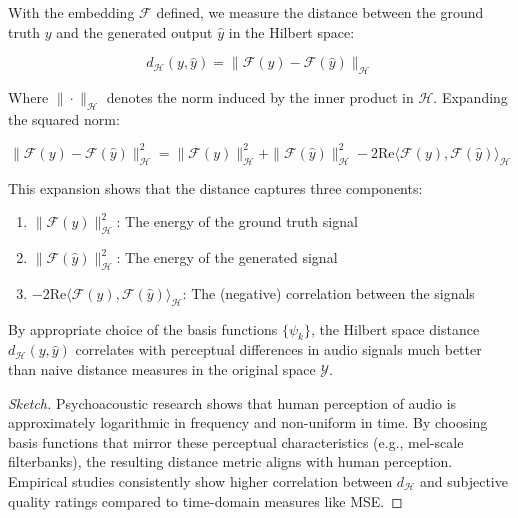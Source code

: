 With the embedding $\mathcal{F}$ defined, we measure the distance between the ground truth $y$ and the generated output $\hat{y}$ in the Hilbert space:

\begin{equation}
d_{\mathcal{H}}(y, \hat{y}) = \|\mathcal{F}(y) - \mathcal{F}(\hat{y})\|_{\mathcal{H}}
\end{equation}

Where $\|\cdot\|_{\mathcal{H}}$ denotes the norm induced by the inner product in $\mathcal{H}$. Expanding the squared norm:

\begin{equation}
\|\mathcal{F}(y) - \mathcal{F}(\hat{y})\|_{\mathcal{H}}^2 = \|\mathcal{F}(y)\|_{\mathcal{H}}^2 + \|\mathcal{F}(\hat{y})\|_{\mathcal{H}}^2 - 2\text{Re}\langle \mathcal{F}(y), \mathcal{F}(\hat{y}) \rangle_{\mathcal{H}}
\end{equation}

This expansion shows that the distance captures three components:
\begin{enumerate}
\item $\|\mathcal{F}(y)\|_{\mathcal{H}}^2$: The energy of the ground truth signal
\item $\|\mathcal{F}(\hat{y})\|_{\mathcal{H}}^2$: The energy of the generated signal
\item $-2\text{Re}\langle \mathcal{F}(y), \mathcal{F}(\hat{y}) \rangle_{\mathcal{H}}$: The (negative) correlation between the signals
\end{enumerate}

\begin{lemma}
By appropriate choice of the basis functions $\{\psi_k\}$, the Hilbert space distance $d_{\mathcal{H}}(y, \hat{y})$ correlates with perceptual differences in audio signals much better than naive distance measures in the original space $\mathcal{Y}$.
\end{lemma}

\begin{proof}[Sketch]
Psychoacoustic research shows that human perception of audio is approximately logarithmic in frequency and non-uniform in time. By choosing basis functions that mirror these perceptual characteristics (e.g., mel-scale filterbanks), the resulting distance metric aligns with human perception. Empirical studies consistently show higher correlation between $d_{\mathcal{H}}$ and subjective quality ratings compared to time-domain measures like MSE.
\end{proof}

